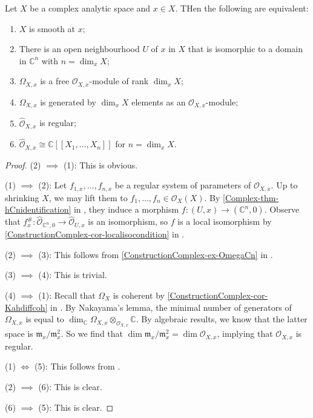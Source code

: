 \begin{proposition}\label{prop-smoothchar}
    Let $X$ be a complex analytic space and $x\in X$. THen the following are equivalent:
    \begin{enumerate}
        \item $X$ is smooth at $x$;
        \item There is an open neighbourhood $U$ of $x$ in $X$ that is isomorphic to a domain in $\mathbb{C}^n$ with $n=\dim_x X$;
        \item $\Omega_{X,x}$ is a free $\mathcal{O}_{X,x}$-module of rank $\dim_x X$;
        \item $\Omega_{X,x}$ is generated by $\dim_x X$ elements as an $\mathcal{O}_{X,x}$-module;
        \item $\hat{\mathcal{O}}_{X,x}$ is regular;
        \item $\hat{\mathcal{O}}_{X,x}\cong \mathbb{C}[[X_1,\ldots,X_n]]$ for $n=\dim_x X$.
    \end{enumerate}
\end{proposition}
\begin{proof}
    (2) $\implies$ (1): This is obvious.

    (1) $\implies$ (2): Let $f_{1,x},\ldots,f_{n,x}$ be a regular system of parameters of $\mathcal{O}_{X,x}$. Up to shrinking $X$, we may lift them to $f_1,\ldots,f_n\in \mathcal{O}_X(X)$. By \cref{Complex-thm-hCnidentification} in , they induce a morphism $f:(U,x)\rightarrow (\mathbb{C}^n,0)$. Observe that $f^{\#}_{x}:\hat{\mathcal{O}}_{\mathbb{C}^n,0}\rightarrow \hat{\mathcal{O}}_{U,x}$ is an isomorphism, so $f$ is a local isomorphism by \cref{ConstructionComplex-cor-localisocondition} in .

    (2) $\implies$ (3): This follows from \cref{ConstructionComplex-ex-OmegaCn} in .

    (3) $\implies$ (4): This is trivial.

    (4) $\implies$ (1): Recall that $\Omega_X$ is coherent by \cref{ConstructionComplex-cor-Kahdiffcoh} in .
    By Nakayama's lemma, the minimal number of generators of $\Omega_{X,x}$ is equal to $\dim_{\mathbb{C}} \Omega_{X,x}\otimes_{\mathcal{O}_{X,x}} \mathbb{C}$. By algebraic results, we know that the latter space is $\mathfrak{m}_x/\mathfrak{m}_x^2$. So we find that $\dim \mathfrak{m}_x/\mathfrak{m}_x^2=\dim\mathcal{O}_{X,x}$, implying that $\mathcal{O}_{X,x}$ is regular.

    (1) $\Leftrightarrow$ (5): This follows from \cite[\href{https://stacks.math.columbia.edu/tag/07NY}{Tag 07NY}]{stacks-project}.

    (2) $\implies$ (6): This is clear.

    (6) $\implies$ (5): This is clear.
\end{proof}

